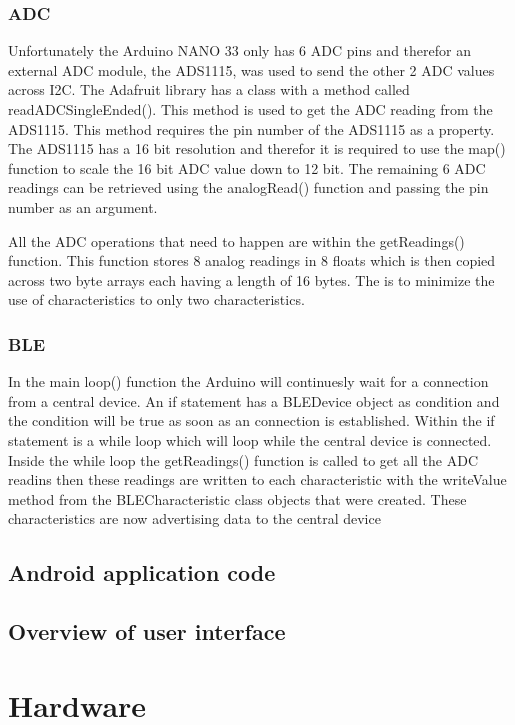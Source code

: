 \subsubsection{ADC} 

Unfortunately the Arduino NANO 33 only has 6 ADC pins and therefor an external ADC module, the ADS1115, was used to send the other 2 ADC values across I2C. The Adafruit library has a class with a method called readADCSingleEnded(). This method is used to get the ADC reading from the ADS1115. This method requires the pin number of the ADS1115 as a property. The ADS1115 has a 16 bit resolution and therefor it is required to use the map() function to scale the 16 bit ADC value down to 12 bit. The remaining 6 ADC readings can be retrieved using the analogRead() function and passing the pin number as an argument.

All the ADC operations that need to happen are within the getReadings() function. This function stores 8 analog readings in 8 floats which is then copied across two byte arrays each having a length of 16 bytes. The is to minimize the use of characteristics to only two characteristics.

\subsubsection{BLE}

In the main loop() function the Arduino will continuesly wait for a connection from a central device. An if statement has a BLEDevice object as condition and the condition will be true as soon as an connection is established. Within the if statement is a while loop which will loop while the central device is connected. Inside the while loop the getReadings() function is called to get all the ADC readins then these readings are written to each characteristic with the writeValue method from the BLECharacteristic class objects that were created. These characteristics are now advertising data to the central device



\subsection{Android application code}

\subsection{Overview of user interface}

\section{Hardware}

